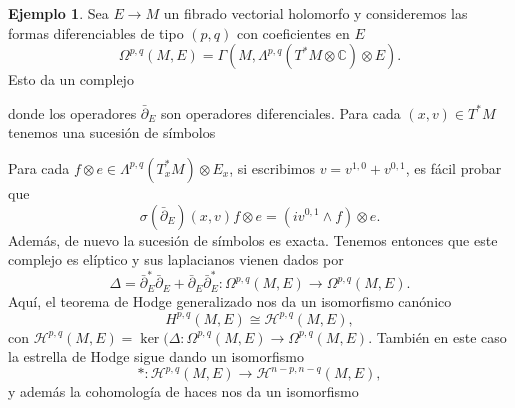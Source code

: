 \documentclass[12pt,a4paper]{article}
\theoremstyle{definition} \newtheorem{defn}[thm]{Definición}
\theoremstyle{definition} \newtheorem{ejemplo}[thm]{Ejemplo}
\theoremstyle{definition} \newtheorem{ejercicio}[thm]{Ejercicio}
\theoremstyle{remark} \newtheorem*{obs}{Observación}
\newcommand{\dol}{\bar{\partial}}
\newcommand{\HH}{\mathcal{H}}
\newcommand{\CC}{\mathbb{C}}
\begin{document}
\begin{ejemplo}
  Sea $E\rightarrow M$ un fibrado vectorial holomorfo y consideremos las formas diferenciables de tipo $(p,q)$ con coeficientes en $E$
  \begin{equation*}
    \Omega^{p,q}(M,E) = \Gamma(M,\Lambda^{p,q}(T^*M\otimes \CC)\otimes E).
  \end{equation*}
  Esto da un complejo
  \begin{center}
  \end{center}
  donde los operadores $\dol_E$ son operadores diferenciales. Para cada $(x,v)\in T^*M$ tenemos una sucesión de símbolos
  \begin{center}
  \end{center}
  Para cada $f\otimes e\in \Lambda^{p,q}(T_x^*M)\otimes E_x$, si escribimos $v=v^{1,0}+v^{0,1}$, es fácil probar que
  \begin{equation*}
    \sigma(\dol_E)(x,v) f \otimes e = (iv^{0,1}\wedge f)\otimes e.
  \end{equation*}
  Además, de nuevo la sucesión de símbolos es exacta. Tenemos entonces que este complejo es elíptico y sus laplacianos vienen dados por
  \begin{equation*}
    \Delta = \dol_E^*\dol_E + \dol_E \dol_E^*:\Omega^{p,q}(M,E) \longrightarrow \Omega^{p,q}(M,E).
  \end{equation*}
  Aquí, el teorema de Hodge generalizado nos da un isomorfismo canónico
  \begin{equation*}
    H^{p,q}(M,E) \cong \HH^{p,q}(M,E), 
  \end{equation*}
  con $\HH^{p,q}(M,E)=\ker(\Delta:\Omega^{p,q}(M,E)\rightarrow \Omega^{p,q}(M,E)$. También en este caso la estrella de Hodge sigue dando un isomorfismo
  \begin{equation*}
    *:\HH^{p,q}(M,E) \longrightarrow \HH^{n-p,n-q}(M,E),
  \end{equation*}
  y además la cohomología de haces nos da un isomorfismo
  \begin{equation*}

\end{equation*}
\end{ejemplo}
\end{document}
